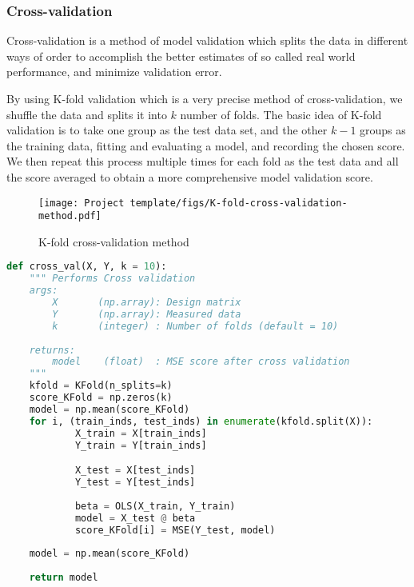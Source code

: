 \documentclass[../main.tex]{subfiles}
\begin{document}
\subsubsection{Cross-validation}\label{refmethod: crossvalidation}

Cross-validation is a method of model validation which splits the data in different ways of order to accomplish the better estimates of so called real world performance, and minimize validation error.

By using K-fold validation which is a very precise method of cross-validation, we shuffle the data and splits it into $k$ number of folds. The basic idea of K-fold validation is to take one group as the test data set, and the other $k-1$ groups as the training data, fitting and evaluating a model, and recording the chosen score. We then repeat this process multiple times for each fold as the test data and all the score averaged to obtain a more comprehensive model validation score.

\begin{figure}[h!]
    \centering
    \texttt{[image: Project template/figs/K-fold-cross-validation-method.pdf]}
    \caption{K-fold cross-validation method}
    \label{fig:k_fold_crossval}
\end{figure}
\vskip0.1in

\begin{lstlisting}[language=Python]
def cross_val(X, Y, k = 10):
    """ Performs Cross validation 
    args: 
        X       (np.array): Design matrix
        Y       (np.array): Measured data
        k       (integer) : Number of folds (default = 10)
        
    returns:
        model    (float)  : MSE score after cross validation
    """
    kfold = KFold(n_splits=k)
    score_KFold = np.zeros(k)
    model = np.mean(score_KFold)
    for i, (train_inds, test_inds) in enumerate(kfold.split(X)):
            X_train = X[train_inds]
            Y_train = Y[train_inds]

            X_test = X[test_inds]
            Y_test = Y[test_inds]
            
            beta = OLS(X_train, Y_train)
            model = X_test @ beta
            score_KFold[i] = MSE(Y_test, model)
    
    model = np.mean(score_KFold)
    
    return model
\end{lstlisting}
\end{document}
